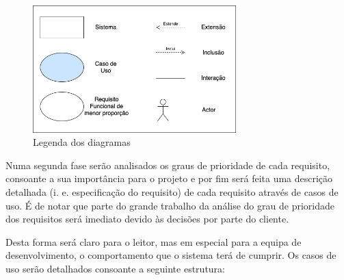 \begin{figure}[ht!]
	\begin{center}
		\includegraphics[width=0.7\textwidth]{img/rf/legenda}
		\caption{Legenda dos diagramas}
		\label{fig:rf-legenda}
	\end{center}
\end{figure}

Numa segunda fase serão analisados os graus de prioridade de cada requisito, consoante a sua importância para o projeto e por fim será feita uma descrição detalhada (i. e. especificação do requisito) de cada requisito através de casos de uso. É de notar que parte do grande trabalho da análise do grau de prioridade dos requisitos será imediato devido às decisões por parte do cliente.

Desta forma será claro para o leitor, mas em especial para a equipa de desenvolvimento, o comportamento que o sistema terá de cumprir. Os casos de uso serão detalhados consoante a seguinte estrutura:

